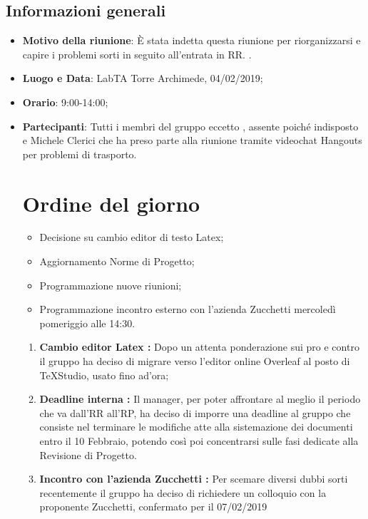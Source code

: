 \documentclass[12pt]{article}
\begin{document}
    \subsection{Informazioni generali}
    \begin{itemize}
        \item \textbf{Motivo della riunione}: È stata indetta questa riunione per riorganizzarsi e capire i problemi sorti in seguito all'entrata in RR.   \pedice.
        \item \textbf{Luogo e Data}: LabTA Torre Archimede, 04/02/2019;
        \item \textbf{Orario}: 9:00-14:00;
        \item \textbf{Partecipanti}: Tutti i membri del gruppo eccetto \daG, 
        assente poiché indisposto e Michele Clerici che ha preso parte alla riunione tramite videochat Hangouts per problemi di trasporto.
        \newpage
        \section{Ordine del giorno}
        \begin{itemize}
        \item Decisione su cambio editor di testo Latex;
        \item Aggiornamento Norme di Progetto;
        \item Programmazione nuove riunioni;
        \item Programmazione incontro esterno con l'azienda Zucchetti mercoledì pomeriggio alle 14:30.
        \end{itemize}
        
        \newpage
    \begin{enumerate}
\section{Risultati}
    \subsection{Ordine del giorno}
        \item \textbf{Cambio editor Latex :} Dopo un attenta ponderazione sui pro e contro il gruppo ha deciso di migrare verso l'editor online Overleaf al posto di TeXStudio, usato fino ad'ora;
        \item \textbf{Deadline interna :} Il manager, per poter affrontare al meglio il periodo che va dall'RR all'RP, ha deciso di imporre una deadline al gruppo che consiste nel terminare le modifiche atte alla sistemazione dei documenti entro il 10 Febbraio, potendo così poi concentrarsi sulle fasi dedicate alla Revisione di Progetto.
        \item \textbf{Incontro con l'azienda Zucchetti :} Per scemare diversi dubbi sorti recentemente il gruppo ha deciso di richiedere un colloquio con la proponente Zucchetti, confermato per il 07/02/2019
    \end{enumerate}

\end{itemize}
\end{document}
